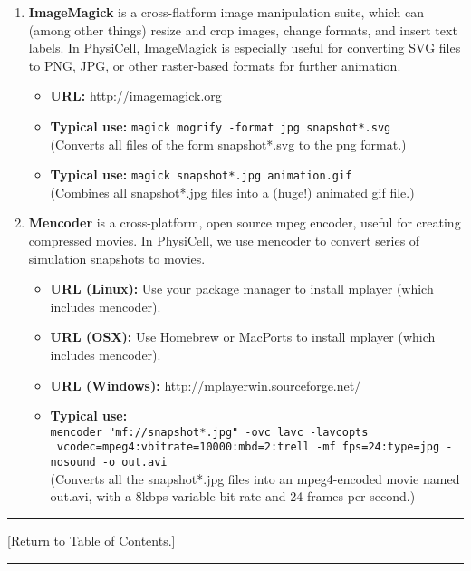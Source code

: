 \documentclass[12pt]{article}
\renewcommand{\v}{\verb}
\newcommand{\TOClink}{\begin{center}\hrule\vskip-10pt\phantom{.}\hfill[Return to \hyperlink{TOC}{Table of Contents}.]\hfill\phantom{.}\vskip3pt\hrule\end{center}}
\begin{document}
\begin{enumerate}
\item 
\textbf{ImageMagick} is a cross-flatform image manipulation suite, which can (among other things)
resize and crop images, change formats, and insert text labels. In PhysiCell, ImageMagick is especially 
useful for converting SVG files to PNG, JPG, or other raster-based formats for further animation. 

\begin{itemize}
\item\textbf{URL:} 
\href{http://imagemagick.org}{http://imagemagick.org} 
\item\textbf{Typical use:} \v|magick mogrify -format jpg snapshot*.svg| \\
\hspace{1in}(Converts all files of the form snapshot*.svg to the png format.)
\item\textbf{Typical use:} \v|magick snapshot*.jpg animation.gif| \\
\hspace{1in}(Combines all snapshot*.jpg files into a (huge!) animated gif file.)
\end{itemize}

\item 
\textbf{Mencoder} is a cross-platform, open source mpeg encoder, useful for creating compressed 
movies. In PhysiCell, we use mencoder to convert series of simulation snapshots to movies. 
\begin{itemize}
\item \textbf{URL (Linux):} Use your package manager to install mplayer (which includes mencoder). 
\item \textbf{URL (OSX):} Use Homebrew or MacPorts to install mplayer (which includes mencoder).
\item \textbf{URL (Windows):} \href{http://mplayerwin.sourceforge.net/}{http://mplayerwin.sourceforge.net/}
\item \textbf{Typical use:} \\
\normalsize\v|mencoder "mf://snapshot*.jpg" -ovc lavc -lavcopts| \\
\normalsize\v| vcodec=mpeg4:vbitrate=10000:mbd=2:trell -mf fps=24:type=jpg -nosound -o out.avi|\normalsize \\
\hspace{1in}(Converts all the snapshot*.jpg files into an mpeg4-encoded movie named out.avi, with a 8kbps variable bit rate and 24 frames per second.) 
\end{itemize}

\end{enumerate}
\TOClink
\end{document}
